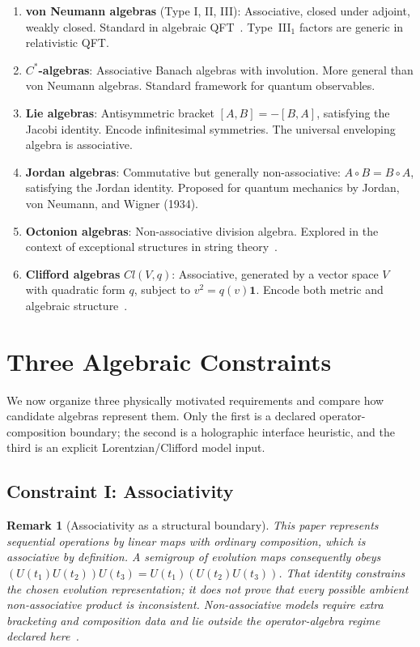 \documentclass[12pt]{article}
\newtheorem{remark}[theorem]{Remark}
\begin{document}
\begin{enumerate}
\item \textbf{von Neumann algebras} (Type I, II, III): Associative, closed under adjoint, weakly closed. Standard in algebraic QFT~\cite{Haag1996}. Type~III$_1$ factors are generic in relativistic QFT.
\item \textbf{$C^*$-algebras}: Associative Banach algebras with involution. More general than von Neumann algebras. Standard framework for quantum observables.
\item \textbf{Lie algebras}: Antisymmetric bracket $[A,B] = -[B,A]$, satisfying the Jacobi identity. Encode infinitesimal symmetries. The universal enveloping algebra is associative.
\item \textbf{Jordan algebras}: Commutative but generally non-associative: $A \circ B = B \circ A$, satisfying the Jordan identity. Proposed for quantum mechanics by Jordan, von Neumann, and Wigner (1934).
\item \textbf{Octonion algebras}: Non-associative division algebra. Explored in the context of exceptional structures in string theory~\cite{Gunaydin1973}.
\item \textbf{Clifford algebras} $Cl(V,q)$: Associative, generated by a vector space $V$ with quadratic form $q$, subject to $v^2 = q(v)\mathbf{1}$. Encode both metric and algebraic structure~\cite{Hestenes1966,Doran2003}.
\end{enumerate}

\section{Three Algebraic Constraints}
\label{sec:constraints}

We now organize three physically motivated requirements and compare how candidate algebras represent them.  Only the first is a declared operator-composition boundary; the second is a holographic interface heuristic, and the third is an explicit Lorentzian/Clifford model input.

\subsection{Constraint I: Associativity}

\begin{remark}[Associativity as a structural boundary]
\label{rem:assoc-boundary}
This paper represents sequential operations by linear maps with ordinary composition, which is associative by definition.  A semigroup of evolution maps consequently obeys
$(U(t_1)U(t_2))U(t_3)=U(t_1)(U(t_2)U(t_3))$.
That identity constrains the chosen evolution representation; it does not prove that every possible ambient non-associative product is inconsistent.  Non-associative models require extra bracketing and composition data and lie outside the operator-algebra regime declared here~\cite{Schafer1966,Gunaydin1973}.
\end{remark}
\end{document}
